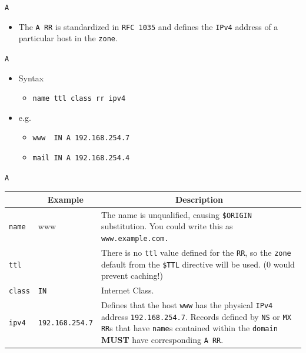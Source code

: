\documentclass[xcolor=table]{beamer}
\begin{document}
\begin{frame}{\texttt{A}}
  \begin{itemize}
      \item The \texttt{A RR} is standardized in \texttt{RFC 1035} and defines the \texttt{IPv4} address of a particular host in the \texttt{zone}.
  \end{itemize}
\end{frame}

\begin{frame}{\texttt{A}}
  \begin{itemize}
    \item Syntax
      \begin{itemize}
        \item \texttt{name ttl class rr ipv4}
      \end{itemize}
    \item e.g.
      \begin{itemize}
        \item \texttt{www ~IN A 192.168.254.7}
        \item \texttt{mail IN A 192.168.254.4}
      \end{itemize}
  \end{itemize}
\end{frame}

\begin{frame}{\texttt{A}}
  \begin{table}
    \tiny
    \begin{tabular}{|p{1.6cm}|p{1.6cm}|p{4.7cm}|} 
      \hline
      \rowcolor{gray}
      \multicolumn{1}{|c|}{Syntax} & \multicolumn{1}{c|}{Example} & \multicolumn{1}{c|}{Description}\\ 
      \hline
      \texttt{name}&www&The name is unqualified, causing \texttt{\$ORIGIN} substitution. You could write this as \texttt{www.example.com.}\\
      \hline
      \texttt{ttl}&&There is no \texttt{ttl} value defined for the \texttt{RR}, so the \texttt{zone} default from the \texttt{\$TTL} directive will be used. (0 would prevent caching!)\\
      \hline
      \texttt{class}&\texttt{IN}&Internet Class.\\
      \hline
      \texttt{ipv4}&\texttt{192.168.254.7}&Defines that the host \texttt{www} has the physical \texttt{IPv4} address \texttt{192.168.254.7}. Records defined by \texttt{NS} or \texttt{MX RR}s that have \texttt{name}s contained within the \texttt{domain} \textbf{MUST} have corresponding \texttt{A RR}.\\
      \hline
    \end{tabular}
  \end{table}
\end{frame}
\end{document}
